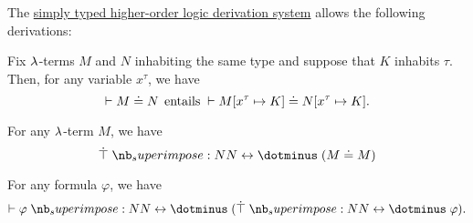 \begin{proposition}\label{thm:simply_typed_hol_derivations}
  The \hyperref[def:simply_typed_hol_proof_tree]{simply typed higher-order logic derivation system} allows the following derivations:
  \begin{thmenum}
     Fix \( {\mathrm \lambda} \)-terms \( M \) and \( N \) inhabiting the same type and suppose that \( K \) inhabits \( \tau \). Then, for any variable \( x^\tau \), we have
    \begin{equation}\label{eq:thm:simply_typed_hol_derivations/substitution_of_equal_terms}
      \vdash M \syneq N \thinspace \T{entails} {}\vdash M[x^\tau \mapsto K] \syneq N[x^\tau \mapsto K].
    \end{equation}

     For any \( {\mathrm \lambda} \)-term \( M \), we have
    \begin{equation}\label{eq:thm:simply_typed_hol_derivations/refl_iff_top}
      \syntop \syniff (M \syneq M)
    \end{equation}

     For any formula \( \varphi \), we have
    \begin{equation}\label{eq:thm:simply_typed_hol_derivations/top_elimination}
      \vdash \varphi \syniff (\syntop \syniff \varphi).
    \end{equation}
  \end{thmenum}
\end{proposition}

